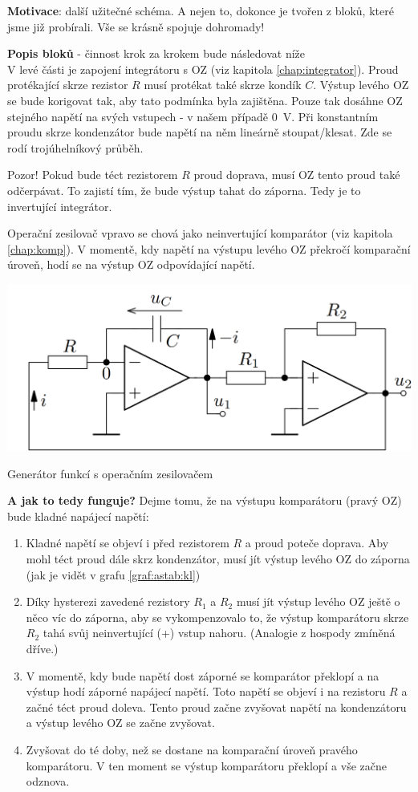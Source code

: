 \documentclass[a4paper,12pt]{article}   %
\begin{document}
\textbf{Motivace}: další užitečné schéma. A nejen to, dokonce je tvořen z bloků, které jsme již probírali. Vše se krásně spojuje dohromady!

\textbf{Popis bloků }- činnost krok za krokem bude následovat níže\\
V levé části je zapojení integrátoru s OZ (viz kapitola \ref{chap:integrator}). Proud protékající skrze rezistor $R$ musí protékat také skrze kondík $C$. Výstup levého OZ se bude korigovat tak, aby tato podmínka byla zajištěna. Pouze tak dosáhne OZ stejného napětí na svých vstupech - v našem případě 0~V. Při konstantním proudu skrze kondenzátor bude napětí na něm lineárně stoupat/klesat. Zde se rodí trojúhelníkový průběh.

Pozor! Pokud bude téct rezistorem $R$ proud doprava, musí OZ tento proud také odčerpávat. To zajistí tím, že bude výstup tahat do záporna. Tedy je to invertující integrátor.

Operační zesilovač vpravo se chová jako neinvertující komparátor (viz kapitola \ref{chap:komp}). V momentě, kdy napětí na výstupu levého OZ překročí komparační úroveň, hodí se na výstup OZ odpovídající napětí.
\begin{schema}[h!]
    \centering
    \includegraphics[width=.7\textwidth]{gen_funct.PNG}
    \caption{Generátor funkcí s operačním zesilovačem}
    \label{sch:gen:fci}
\end{schema}

\textbf{A jak to tedy funguje?} Dejme tomu, že na výstupu komparátoru (pravý OZ) bude kladné napájecí napětí:
\begin{enumerate}
    \item Kladné napětí se objeví i před rezistorem $R$ a proud poteče doprava. Aby mohl téct proud dále skrz kondenzátor, musí jít výstup levého OZ do záporna (jak je vidět v grafu \ref{graf:astab:kl})
    \item Díky hysterezi zavedené rezistory $R_1$ a $R_2$ musí jít výstup levého OZ ještě o něco víc do záporna, aby se vykompenzovalo to, že výstup komparátoru skrze $R_2$ tahá svůj neinvertující (+) vstup nahoru. (Analogie z hospody zmíněná dříve.)
    \item V momentě, kdy bude napětí dost záporné se komparátor překlopí a na výstup hodí záporné napájecí napětí. Toto napětí se objeví i na rezistoru $R$ a začné téct proud doleva. Tento proud začne zvyšovat napětí na kondenzátoru a výstup levého OZ se začne zvyšovat.
    \item Zvyšovat do té doby, než se dostane na komparační úroveň pravého komparátoru. V ten moment se výstup komparátoru překlopí a vše začne odznova.
\end{enumerate}
\end{document}
